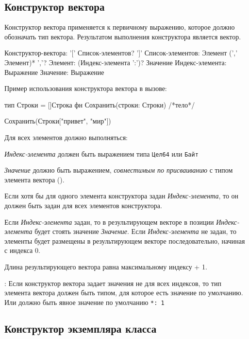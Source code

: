 \hypertarget{vector-composite}{%
\subsection{Конструктор вектора}\label{expr:vector-composite}}

Конструктор вектора применяется к первичному выражению, которое должно обозначать тип вектора. Результатом выполнения конструктора является вектор.

\begin{Grammar}
Конструктор-вектора: '[' Список-элементов? ']' 
Список-элементов: Элемент (',' Элемент)* ','?
Элемент: (Индекс-элемента ':')? Значение
Индекс-элемента: Выражение
Значение: Выражение
\end{Grammar}   

Пример использования конструктора вектора в вызове:
\begin{Trivil}[vspace=2pt]
тип Строки = []Строка
фн Сохранить(строки: Строки) { /*тело*/ }

Сохранить(Строки["привет", "мир"])
\end{Trivil}

Для всех элементов должно выполняться:
\begin{d_itemize}
\item
    \emph{Индекс-элемента} должен быть выражением типа \verb|Цел64| или \verb|Байт|
\item
    \emph{Значение} должно быть выражением, \emph{совместимым по присваиванию} с типом элемента вектора ().
\end{d_itemize}

Если хотя бы для одного элемента конструктора задан \emph{Индекс-элемента}, то он должен быть задан для всех элементов конструктора.

Если \emph{Индекс-элемента} задан, то в результирующем векторе в позиции \emph{Индекс-элемента} будет стоять значение \emph{Значение}.
Если \emph{Индекс-элемента} не задан, то элементы будет размещены в результирующем векторе последовательно, начиная с индекса 0.

Длина результирующего вектора равна максимальному индексу + 1.

\TBD: Если конструктор вектора задает значения не для всех индексов, то тип элемента вектора должен быть типом, для которое есть значение по умолчанию. 
Или должно быть явное значение по умолчанию \verb+*: 1+

\hypertarget{class-composite}{%
\subsection{Конструктор экземпляра класса}\label{expr:class-composite}}

